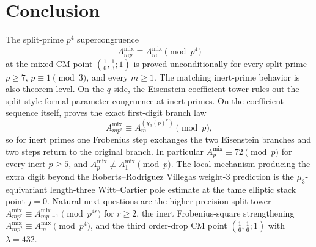 \documentclass[11pt]{amsart}
\theoremstyle{definition}
\theoremstyle{remark}
\begin{document}
\section*{Conclusion}

The split-prime $p^4$ supercongruence
\[
A_{mp}^{\mathrm{mix}}\equiv A_m^{\mathrm{mix}}\pmod{p^4}
\]
at the mixed CM point $(\tfrac16,\tfrac13;1)$ is proved unconditionally for every split prime $p\ge 7$, $p\equiv 1\pmod 3$, and every $m\ge 1$. The matching inert-prime behavior is also theorem-level. On the $q$-side, the Eisenstein coefficient tower rules out the split-style formal parameter congruence at inert primes. On the coefficient sequence itself,  proves the exact first-digit branch law
\[
A_{mp^r}^{\mathrm{mix}}\equiv A_m^{(\chi_3(p)^r)}\pmod p,
\]
so for inert primes one Frobenius step exchanges the two Eisenstein branches and two steps return to the original branch. In particular $A_p^{\mathrm{mix}}\equiv72\pmod p$ for every inert $p\ge5$, and $A_p^{\mathrm{mix}}\not\equiv A_1^{\mathrm{mix}}\pmod p$. The local mechanism producing the extra digit beyond the Roberts--Rodriguez Villegas weight-$3$ prediction is the $\mu_3$-equivariant length-three Witt--Cartier pole estimate at the tame elliptic stack point $j=0$. Natural next questions are the higher-precision split tower $A_{mp^r}^{\mathrm{mix}}\equiv A_{mp^{r-1}}^{\mathrm{mix}}\pmod{p^{4r}}$ for $r\ge 2$, the inert Frobenius-square strengthening $A_{mp^2}^{\mathrm{mix}}\equiv A_m^{\mathrm{mix}}\pmod{p^4}$, and the third order-drop CM point $(\tfrac16,\tfrac16;1)$ with $\lambda=432$.
\end{document}
